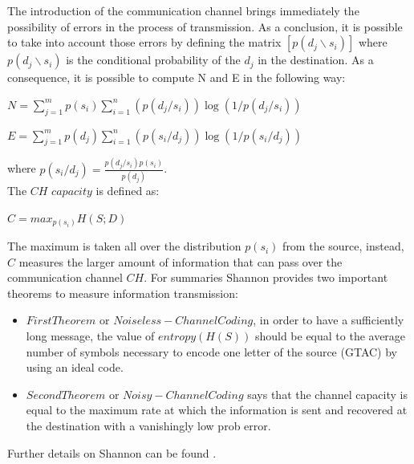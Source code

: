 \documentclass[10pt,twocolumn,twoside]{gsajnl}
\begin{document}
The introduction of the communication channel brings immediately the possibility of errors in the process of transmission.
As a conclusion, it is possible to take into account those errors by defining the matrix $[p(d_{j}\backslash s_{i})]$ where $p(d_{j}\backslash s_{i})$ is the conditional probability of the $d_{j}$ in the destination. As a consequence, it is possible to compute N and E in the following way:
\begin{center}
$ N = \sum_{j = 1}^{m} p(s_{i}) \sum_{i = 1}^{n} (p(d_{j}/s_{i})) \log(1/p(d_{j}/s_{i}))$
\end{center}
\begin{center}
$ E = \sum_{j = 1}^{m} p(d_{j}) \sum_{i = 1}^{n} (p(s_{i}/d_{j})) \log(1/p(s_{i}/d_{j}))$
\end{center}
where $p(s_{i}/d_{j}) = \frac{p(d_{j}/s_{i})p(s_{i})}{p(d_{j})}$.\\
The $CH$ $capacity$ is defined as: 
\begin{center}
    $C = max_{p(s_{i})}{H(S;D)}$
\end{center}
The maximum is taken all over the distribution $p(s_{i})$ from the source, instead, $C$ measures the larger amount of information that can pass over the communication channel $CH$.
For summaries Shannon provides two important theorems to measure information transmission:
\begin{itemize}
    \item $First Theorem$ or $Noiseless-Channel Coding$, in order to have a sufficiently long message, the value of $entropy (H(S))$ should be equal to the average number of symbols necessary to encode one letter of the source (GTAC) by using an ideal code.
    \item $Second Theorem$ or $Noisy-Channel Coding$ says that the channel capacity is equal to the maximum rate at which the information is sent and recovered at the destination with a vanishingly low prob error.
   \end{itemize}
Further details on Shannon can be found \cite{lombardi2016shannon}.
\end{document}
